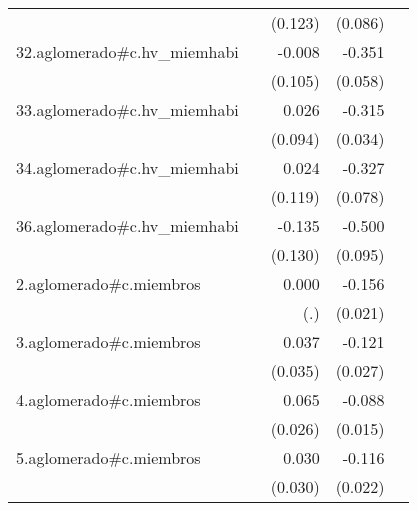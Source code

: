 {\begin{longtable}{l*{4}{D{.}{.}{-1}}}
            &                     &     (0.123)         &     (0.086)         &                     \\
\addlinespace
32.aglomerado#c.hv\_miemhabi&                     &      -0.008         &      -0.351\sym{***}&                     \\
            &                     &     (0.105)         &     (0.058)         &                     \\
\addlinespace
33.aglomerado#c.hv\_miemhabi&                     &       0.026         &      -0.315\sym{***}&                     \\
            &                     &     (0.094)         &     (0.034)         &                     \\
\addlinespace
34.aglomerado#c.hv\_miemhabi&                     &       0.024         &      -0.327\sym{***}&                     \\
            &                     &     (0.119)         &     (0.078)         &                     \\
\addlinespace
36.aglomerado#c.hv\_miemhabi&                     &      -0.135         &      -0.500\sym{***}&                     \\
            &                     &     (0.130)         &     (0.095)         &                     \\
\addlinespace
2.aglomerado#c.miembros&                     &       0.000         &      -0.156\sym{***}&                     \\
            &                     &         (.)         &     (0.021)         &                     \\
\addlinespace
3.aglomerado#c.miembros&                     &       0.037         &      -0.121\sym{***}&                     \\
            &                     &     (0.035)         &     (0.027)         &                     \\
\addlinespace
4.aglomerado#c.miembros&                     &       0.065\sym{*}  &      -0.088\sym{***}&                     \\
            &                     &     (0.026)         &     (0.015)         &                     \\
\addlinespace
5.aglomerado#c.miembros&                     &       0.030         &      -0.116\sym{***}&                     \\
            &                     &     (0.030)         &     (0.022)         &                     \\

\end{longtable}}
